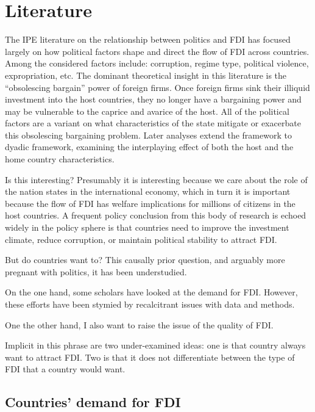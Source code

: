 \section{Literature}

The IPE literature on the relationship between politics and FDI has focused largely on how political factors shape and direct the flow of FDI across countries. Among the considered factors include: corruption, regime type, political violence, expropriation, etc. The dominant theoretical insight in this literature is the ``obsolescing bargain'' power of foreign firms. Once foreign firms sink their illiquid investment into the host countries, they no longer have a bargaining power and may be vulnerable to the caprice and avarice of the host. All of the political factors are a variant on what characteristics of the state mitigate or exacerbate this obsolescing bargaining problem.  Later analyses extend the framework to dyadic framework, examining the interplaying effect of both the host and the home country characteristics.

Is this interesting? Presumably it is interesting because we care about the role of the nation states in the international economy, which in turn it is important because the flow of FDI has welfare implications for millions of citizens in the host countries. A frequent policy conclusion from this body of research is echoed widely in the policy sphere is that countries need to improve the investment climate, reduce corruption, or maintain political stability to attract FDI.

But do countries want to? This causally prior question, and arguably more pregnant with politics, it has been understudied. 

On the one hand, some scholars have looked at the demand for FDI. However, these efforts have been stymied by recalcitrant issues with data and methods.

One the other hand, I also want to raise the issue of the quality of FDI.

Implicit in this phrase are two under-examined ideas: one is that country always want to attract FDI. Two is that it does not differentiate between the type of FDI that a country would want.

\subsection{Countries' demand for FDI}

